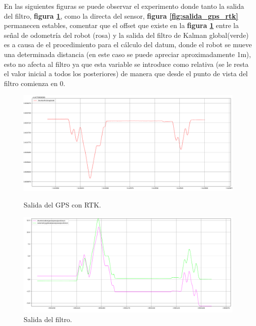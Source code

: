 En las siguientes figuras se puede observar el experimento donde tanto la salida del filtro, \textbf{figura \ref{fig:salida_ekf_rtk}}, como la 
directa del sensor, \textbf{figura \ref{fig:salida_gps_rtk}} permanecen estables, comentar que el offset que existe en la 
\textbf{figura \ref{fig:salida_ekf_rtk}} entre la señal de odometría del robot (rosa) y la salida del filtro de Kalman global(verde) es a causa de 
el procedimiento para el cálculo del datum, donde el robot se mueve una determinada distancia (en este caso se puede apreciar aproximadamente 1m), esto no afecta al filtro ya que esta variable se introduce como relativa (se le resta el valor inicial a todos los posteriores) de manera 
que desde el punto de vista del filtro comienza en 0.

\begin{figure}[htbp]
  \centering
    \captionsetup{skip=0pt}  %
  \begin{minipage}[b]{0.45\textwidth}
    \centering

    \includegraphics[width=\textwidth]{images/longitude_gps.png}
    \caption{Salida del GPS con RTK.}
    \label{fig:salida_gps_rtk}
  \end{minipage}
  \hfill
  \begin{minipage}[b]{0.45\textwidth} 
    \centering
    \includegraphics[width=\textwidth]{images/odom_global_rtk.png}
    \caption{Salida del filtro.}
    \label{fig:salida_ekf_rtk}
  \end{minipage}
\end{figure}

